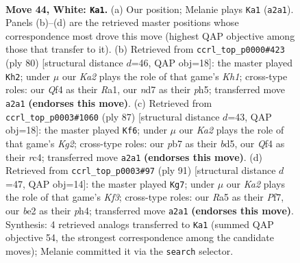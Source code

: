 \documentclass[11pt]{article}
\begin{document}
\clearpage

\begin{figure}[p]\centering
\begin{subfigure}{0.46\textwidth}\centering
\resizebox{\linewidth}{!}{%
\newchessgame
\chessboard[
  setfen={2k5/1p1n4/1r1p4/R7/1P2PQ2/8/K3b1PP/8 w - - 0 44},
  showmover=false,
  pgfstyle=straightmove, color=movearrow, markmove={a2-a1}
]}
\caption{}
\end{subfigure}\hfill
\begin{subfigure}{0.46\textwidth}\centering
\resizebox{\linewidth}{!}{%
\newchessgame
\chessboard[
  setfen={8/p4rk1/3r2p1/7p/4R3/5P1P/6P1/R6K w - - 0 41},
  showmover=false,
  pgfstyle=straightmove, color=movearrow, markmove={h1-h2}
]}
\caption{}
\end{subfigure}
\\[4pt]
\begin{subfigure}{0.46\textwidth}\centering
\resizebox{\linewidth}{!}{%
\newchessgame
\chessboard[
  setfen={8/6k1/8/3B1p2/2Rp2p1/6P1/1q3P2/5NK1 b - - 4 44},
  showmover=false,
  pgfstyle=straightmove, color=movearrow, markmove={g7-f6}
]}
\caption{}
\end{subfigure}\hfill
\begin{subfigure}{0.46\textwidth}\centering
\resizebox{\linewidth}{!}{%
\newchessgame
\chessboard[
  setfen={8/1p3p2/5k2/1R6/4q1pP/8/5P1P/1R4K1 b - - 2 46},
  showmover=false,
  pgfstyle=straightmove, color=movearrow, markmove={f6-g7}
]}
\caption{}
\end{subfigure}
\caption{\textbf{Move 44, White: \texttt{Ka1}.} (a) Our position; Melanie plays \texttt{Ka1} (\texttt{a2a1}). Panels (b)--(d) are the retrieved master positions whose correspondence most drove this move (highest QAP objective among those that transfer to it). (b) Retrieved from \texttt{ccrl\_top\_p0000\#423} (ply 80) [structural distance $d$=46, QAP obj=18]: the master played \texttt{Kh2}; under $\mu$ our \emph{Ka2} plays the role of that game's \emph{Kh1}; cross-type roles: our \emph{Q}f4 as their \emph{R}a1, our \emph{n}d7 as their \emph{p}h5; transferred move \texttt{a2a1} \textbf{(endorses this move)}. (c) Retrieved from \texttt{ccrl\_top\_p0003\#1060} (ply 87) [structural distance $d$=43, QAP obj=18]: the master played \texttt{Kf6}; under $\mu$ our \emph{Ka2} plays the role of that game's \emph{Kg2}; cross-type roles: our \emph{p}b7 as their \emph{b}d5, our \emph{Q}f4 as their \emph{r}c4; transferred move \texttt{a2a1} \textbf{(endorses this move)}. (d) Retrieved from \texttt{ccrl\_top\_p0003\#97} (ply 91) [structural distance $d$=47, QAP obj=14]: the master played \texttt{Kg7}; under $\mu$ our \emph{Ka2} plays the role of that game's \emph{Kf3}; cross-type roles: our \emph{R}a5 as their \emph{P}f7, our \emph{b}e2 as their \emph{p}h4; transferred move \texttt{a2a1} \textbf{(endorses this move)}. Synthesis: 4 retrieved analogs transferred to \texttt{Ka1} (summed QAP objective 54, the strongest correspondence among the candidate moves); Melanie committed it via the \texttt{search} selector.}
\label{fig:thought-m86}
\end{figure}
\end{document}
